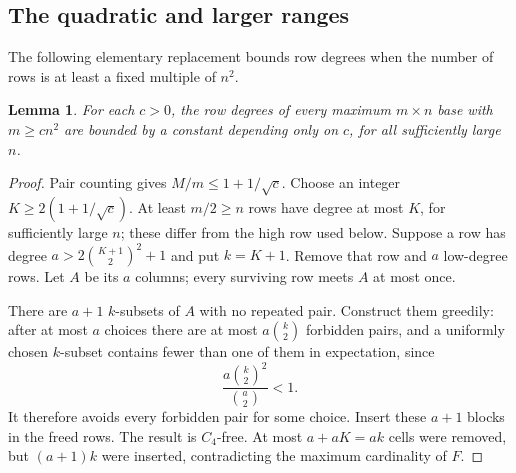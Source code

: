\documentclass[11pt,a4paper]{article}
\newtheorem{lemma}[theorem]{Lemma}
\theoremstyle{definition}
\begin{document}
\subsection{The quadratic and larger ranges}

The following elementary replacement bounds row degrees when the
number of rows is at least a fixed multiple of $n^2$.

\begin{lemma}\label{lem:bounded-row-trade}
For each $c>0$, the row degrees of every maximum $m\times n$ base
with $m\ge cn^2$ are bounded by a constant depending only on $c$,
for all sufficiently large $n$.
\end{lemma}
\begin{proof}
Pair counting gives $M/m\le1+1/\sqrt c$. Choose an integer
$K\ge2(1+1/\sqrt c)$. At least $m/2\ge n$ rows have degree at most
$K$, for sufficiently large $n$; these differ from the high row used below.
Suppose a row has degree $a>2\binom{K+1}{2}^2+1$ and put $k=K+1$.
Remove that row and $a$ low-degree rows. Let $A$ be its $a$ columns;
every surviving row meets $A$ at most once.

There are $a+1$ $k$-subsets of $A$ with no repeated pair. Construct
them greedily: after at most $a$ choices there are at most
$a\binom k2$ forbidden pairs, and a uniformly chosen $k$-subset
contains fewer than one of them in expectation, since
\[
 \frac{a\binom k2^2}{\binom a2}<1.
\]
It therefore avoids every forbidden pair for some choice.
Insert these $a+1$ blocks in the freed rows. The result is $C_4$-free.
At most $a+aK=ak$ cells were removed, but $(a+1)k$ were inserted,
contradicting the maximum cardinality of $F$.
\end{proof}
\end{document}
